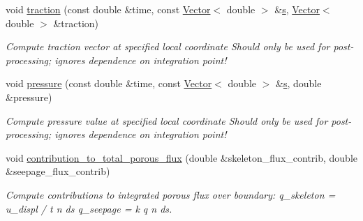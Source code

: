 \begin{DoxyCompactItemize}
void \hyperlink{classoomph_1_1AxisymmetricPoroelasticityTractionElement_abb8e937540df8384b6129793497f1e50}{traction} (const double \&time, const \hyperlink{classoomph_1_1Vector}{Vector}$<$ double $>$ \&\hyperlink{cfortran_8h_ab7123126e4885ef647dd9c6e3807a21c}{s}, \hyperlink{classoomph_1_1Vector}{Vector}$<$ double $>$ \&traction)
\begin{DoxyCompactList}\small\item\em Compute traction vector at specified local coordinate Should only be used for post-\/processing; ignores dependence on integration point! \end{DoxyCompactList}\item 
void \hyperlink{classoomph_1_1AxisymmetricPoroelasticityTractionElement_a9d0a69336be18e1a62450c5c8872777b}{pressure} (const double \&time, const \hyperlink{classoomph_1_1Vector}{Vector}$<$ double $>$ \&\hyperlink{cfortran_8h_ab7123126e4885ef647dd9c6e3807a21c}{s}, double \&pressure)
\begin{DoxyCompactList}\small\item\em Compute pressure value at specified local coordinate Should only be used for post-\/processing; ignores dependence on integration point! \end{DoxyCompactList}\item 
void \hyperlink{classoomph_1_1AxisymmetricPoroelasticityTractionElement_a4618b8dad8a2e2e744016187300c966c}{contribution\+\_\+to\+\_\+total\+\_\+porous\+\_\+flux} (double \&skeleton\+\_\+flux\+\_\+contrib, double \&seepage\+\_\+flux\+\_\+contrib)
\begin{DoxyCompactList}\small\item\em Compute contributions to integrated porous flux over boundary\+: q\+\_\+skeleton =   u\+\_\+displ /  t  n ds q\+\_\+seepage =  k q  n ds. \end{DoxyCompactList}\end{DoxyCompactItemize}
